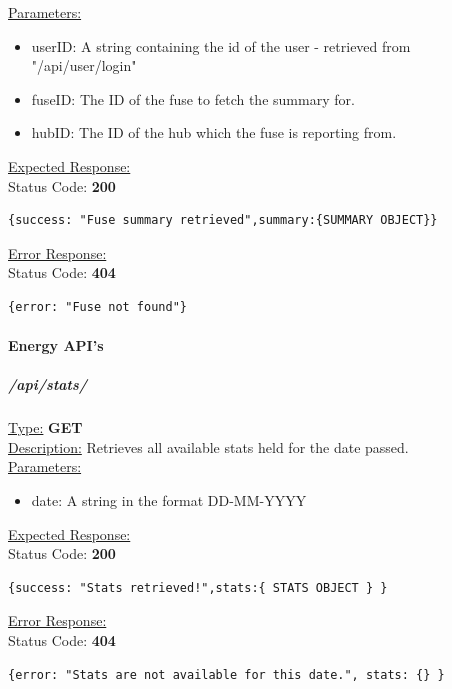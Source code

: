 \documentclass[preprint,12pt,3p]{elsarticle}
\newcommand{\forceindent}{\leavevmode{\parindent=1em\indent}}
\begin{document}
\underline{Parameters:}
\begin{itemize}
\item userID: A string containing the id of the user - retrieved from "/api/user/login"

\item fuseID: The ID of the fuse to fetch the summary for.

\item hubID: The ID of the hub which the fuse is reporting from.

\end{itemize}
\underline{Expected Response:}\\[5pt]
\forceindent Status Code: \textbf{200} \\
\begin{verbatim}
{success: "Fuse summary retrieved",summary:{SUMMARY OBJECT}}
\end{verbatim}
\underline{Error Response:}\\[5pt]
\forceindent Status Code: \textbf{404} \\
\begin{verbatim}
{error: "Fuse not found"}
\end{verbatim}

\paragraph{Energy API's}
\subparagraph*{/api/stats/}
\underline{Type:} \textbf{GET}\\

\underline{Description:} Retrieves all available stats held for the date passed.\\

\underline{Parameters:}

\begin{itemize}
\item date: A string in the format DD-MM-YYYY
\end{itemize}

\underline{Expected Response:}\\[5pt]
\forceindent Status Code: \textbf{200} \\
\begin{verbatim}
{success: "Stats retrieved!",stats:{ STATS OBJECT } }
\end{verbatim}
\underline{Error Response:}\\[5pt]
\forceindent Status Code: \textbf{404} \\
\begin{verbatim}
{error: "Stats are not available for this date.", stats: {} }
\end{verbatim}
\end{document}
